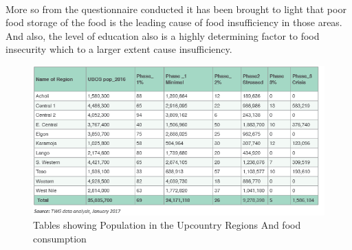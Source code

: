 \documentclass[12pt]{article}
\begin{document}
\paragraph{}More so from the questionnaire conducted it has been brought to light that poor food storage of the food is the leading cause of food insufficiency in those areas. And also, the level of education also is a highly determining factor to food insecurity which to a larger extent cause insufficiency. 
\newpage
\begin{figure}
  \includegraphics[width=\linewidth]{Food.png}
  \caption{Tables showing Population in the Upcountry Regions And food consumption}
  \label{fig:Table1}
\end{figure}
\end{document}
